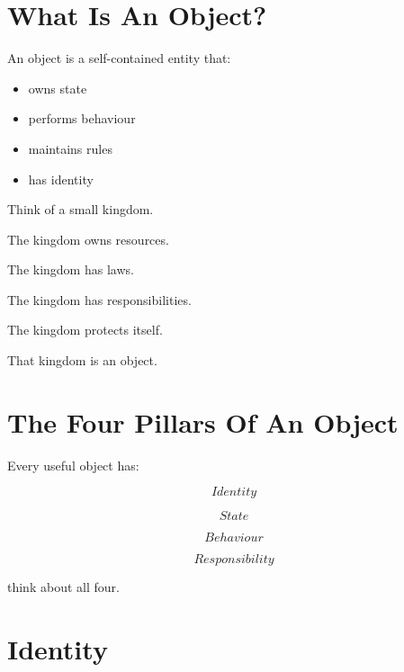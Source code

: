 \documentclass[11pt,a4paper]{book}
\begin{document}

\section{What Is An Object?}

\begin{idea}

An object is a self-contained entity that:

\begin{itemize}
\item owns state
\item performs behaviour
\item maintains rules
\item has identity
\end{itemize}

\end{idea}

\begin{mentalmodel}

Think of a small kingdom.

The kingdom owns resources.

The kingdom has laws.

The kingdom has responsibilities.

The kingdom protects itself.

That kingdom is an object.

\end{mentalmodel}


\section{The Four Pillars Of An Object}

Every useful object has:

\[
Identity
\]

\[
State
\]

\[
Behaviour
\]

\[
Responsibility
\]

think about all four.


\section{Identity}
\end{document}
